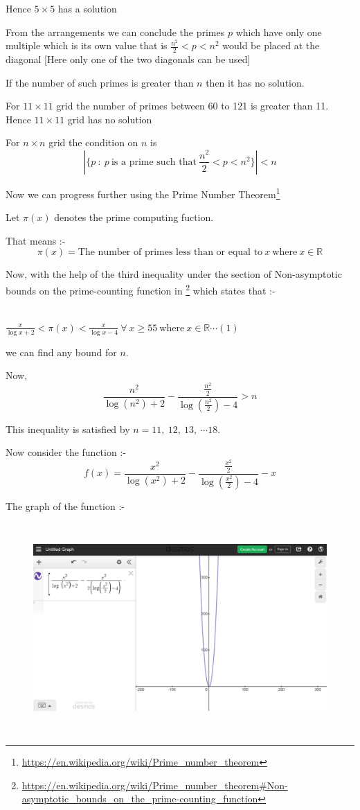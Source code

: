 \documentclass{article}
\begin{document}
\begin{enumerate}
Hence $5\times 5$ has a solution

From the arrangements we can conclude the primes $p$ which have only one multiple which is its own value that is $\displaystyle{\frac{n^2}{2}<p<n^2}$ would be placed at the diagonal [Here only one of the two diagonals can be used]

If the number of such primes is greater than $n$ then it has no solution.

For $11\times 11$ grid the number of primes between 60 to 121 is greater than 11. Hence $11\times 11$ grid has no solution

For $n\times n$ grid the condition on $n$ is $$\left |\{p\ : \ p \ \text{is a prime such that}\ \frac{n^2}{2}<p<n^2 \}\right |<n $$

 Now we can progress further using the Prime Number Theorem\footnote{\url{https://en.wikipedia.org/wiki/Prime_number_theorem}}

Let $\pi (x)$ denotes the prime computing fuction.

That means :- $$\pi (x)= \text{The number of primes less than or equal to}\  x\ \text{where}\ x\in \mathbb{R}$$

Now, with the help of the third inequality under the section of Non-asymptotic bounds on the prime-counting function in \footnote{ \url{https://en.wikipedia.org/wiki/Prime_number_theorem\#Non-asymptotic_bounds_on_the_prime-counting_function}} which states that :-

\ \ \ \ \ \ \ \ \ \ \ \ \ \ \ \ \ \ \ \ \ \ \ \ \ \ \ \ \ \ \ \ \ \ \ \ $\displaystyle{\frac{x}{\log x +2}<\pi (x)<\frac{x}{\log x -4} \ \forall \ x\geq 55 \ \text{where}\ x\in \mathbb{R}} \cdots (1)$

we can find any bound for $n$.

Now,
$$
\frac{n^2}{\log(n^2)+2} - \frac{\frac{n^2}{2}}{\log\left(\frac{n^2}{2}\right) - 4}  > n $$

This inequality is satisfied by $n=11,\ 12, \ 13, \ \cdots 18$.

Now consider the function :-
$$f(x)=\frac{x^2}{\log(x^2)+2} - \frac{\frac{x^2}{2}}{\log\left(\frac{x^2}{2}\right) - 4}-x$$

The graph of the function :-

\begin{figure}[h]
  \centering
\includegraphics[width=15cm, height=8cm]{images/c.jpg}
\end{figure}


\end{enumerate}
\end{document}
